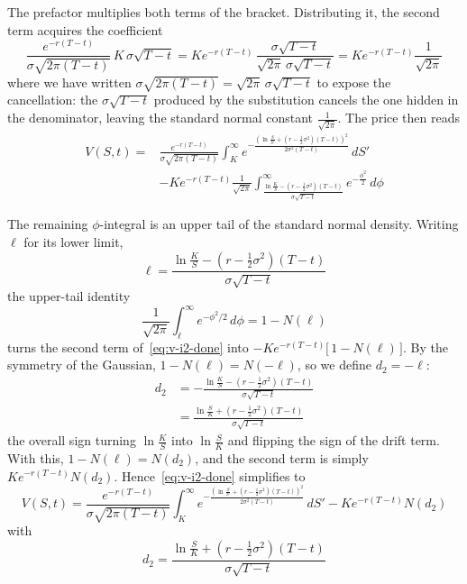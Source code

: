 \documentclass[a4paper,12pt]{article}
\numberwithin{equation}{section}
\begin{document}
The prefactor multiplies both terms of the bracket. Distributing it, the second
term acquires the coefficient
\[
  \frac{e^{-r(T-t)}}{\sigma\sqrt{2\pi(T-t)}}\,K\,\sigma\sqrt{T-t}
  = K e^{-r(T-t)}\,\frac{\sigma\sqrt{T-t}}{\sqrt{2\pi}\,\sigma\sqrt{T-t}}
  = K e^{-r(T-t)}\frac{1}{\sqrt{2\pi}}
\]
where we have written $\sigma\sqrt{2\pi(T-t)} = \sqrt{2\pi}\,\sigma\sqrt{T-t}$ to
expose the cancellation: the $\sigma\sqrt{T-t}$ produced by the substitution
cancels the one hidden in the denominator, leaving the standard normal constant
$\frac{1}{\sqrt{2\pi}}$. The price then reads
\begin{equation}\label{eq:v-i2-done}
\begin{aligned}
  V(S,t) = {}&\frac{e^{-r(T-t)}}{\sigma\sqrt{2\pi(T-t)}}
    \int_{K}^{\infty}
      e^{-\frac{\left(\ln\frac{S}{S'} + \left(r - \frac{1}{2}\sigma^2\right)(T-t)\right)^2}{2\sigma^2(T-t)}}
      \,dS' \\
    &- K e^{-r(T-t)}\frac{1}{\sqrt{2\pi}}
    \int_{\frac{\ln{\frac{K}{S}}-\left(r-\frac{1}{2}\sigma^2\right)(T-t)}{\sigma\sqrt{T-t}}}^{\infty}
    e^{-\frac{\phi^2}{2}}\,d\phi 
\end{aligned}
\end{equation}

The remaining $\phi$-integral is an upper tail of the standard normal density.
Writing $\ell$ for its lower limit,
\[
  \ell = \frac{\ln\frac{K}{S} - \left(r - \tfrac{1}{2}\sigma^2\right)(T-t)}{\sigma\sqrt{T-t}}
\]
the upper-tail identity
\[
  \frac{1}{\sqrt{2\pi}}\int_{\ell}^{\infty} e^{-\phi^2/2}\,d\phi = 1 - N(\ell)
\]
turns the second term of~\eqref{eq:v-i2-done} into
$-K e^{-r(T-t)}\bigl[\,1 - N(\ell)\,\bigr]$. By the symmetry of the Gaussian, $1 - N(\ell) = N(-\ell)$, so we define
$d_2 = -\ell$:
\[
\begin{aligned}
  d_2 &= -\frac{\ln\frac{K}{S} - \left(r - \tfrac{1}{2}\sigma^2\right)(T-t)}{\sigma\sqrt{T-t}} \\
      &= \frac{\ln\frac{S}{K} + \left(r - \tfrac{1}{2}\sigma^2\right)(T-t)}{\sigma\sqrt{T-t}}
\end{aligned}
\]
the overall sign turning $\ln\frac{K}{S}$ into $\ln\frac{S}{K}$ and flipping the
sign of the drift term. With this, $1 - N(\ell) = N(d_2)$, and the second term is
simply $K e^{-r(T-t)} N(d_2)$. Hence~\eqref{eq:v-i2-done} simplifies to
\begin{equation}\label{eq:v-i2-done-simplified}
  V(S,t) = \frac{e^{-r(T-t)}}{\sigma\sqrt{2\pi(T-t)}}
    \int_{K}^{\infty}
      e^{-\frac{\left(\ln\frac{S}{S'} + \left(r - \frac{1}{2}\sigma^2\right)(T-t)\right)^2}{2\sigma^2(T-t)}}
      \,dS'
    - K e^{-r(T-t)}N(d_2)
\end{equation}
with
\begin{equation}\label{eq:d2}
    d_2 = \frac{\ln\frac{S}{K} + \left(r - \tfrac{1}{2}\sigma^2\right)(T-t)}{\sigma\sqrt{T-t}} 
\end{equation}
\end{document}

